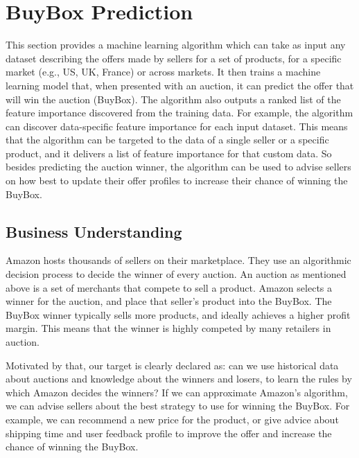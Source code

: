 \section{BuyBox Prediction}
\label{sec:buybox}
This section provides a machine learning algorithm which can take as input any dataset describing the offers made by sellers for a set of products, for a specific market (e.g., US, UK, France) or across markets. It then trains a machine learning model that, when presented with an auction, it can predict the offer that will win the auction (BuyBox). The algorithm also outputs a ranked list of the feature importance discovered from the training data. For example, the algorithm can discover data-specific feature importance for each input dataset. This means that the algorithm can be targeted to the data of a single seller or a specific product, and it delivers a list of feature importance for that custom data. So besides predicting the auction winner, the algorithm can be used to advise sellers on how best to update their offer profiles to increase their chance of winning the BuyBox.

\subsection{Business Understanding}
\label{sec:bbbusiness}
Amazon hosts thousands of  sellers on their marketplace. They use an algorithmic decision process to decide the winner of every auction. An auction as mentioned above is a set of merchants that compete to sell a product. Amazon selects a winner for the auction, and place that seller's product into the BuyBox. The BuyBox winner typically sells more products, and ideally achieves a higher profit margin. This means that the winner is highly competed by many retailers in auction.

Motivated by that, our target is clearly declared as: can we use historical data about auctions and knowledge about the winners and losers, to learn the rules by which Amazon decides the winners? If we can approximate Amazon’s algorithm, we can advise sellers about the best strategy to use for winning the BuyBox. For example, we can recommend a new price for the product, or give advice about shipping time and user feedback profile to improve the offer and increase the chance of winning the BuyBox. 

